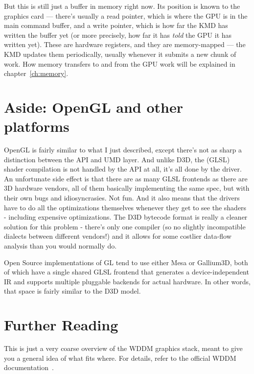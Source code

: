 But this is still just a buffer in memory right now. Its position is known to
the graphics card --- there's usually a read pointer, which is where the GPU is
in the main command buffer, and a write pointer, which is how far the KMD has
written the buffer yet (or more precisely, how far it has \emph{told} the GPU
it has written yet). These are hardware registers, and they are memory-mapped
--- the KMD updates them periodically, usually whenever it submits a new chunk
of work. How memory transfers to and from the GPU work will be explained in
chapter~\ref{ch:memory}.

\section{Aside: OpenGL and other platforms}

OpenGL is fairly similar to what I just described, except there's not as sharp
a distinction between the API and UMD layer. And unlike D3D, the (GLSL) shader
compilation is not handled by the API at all, it's all done by the driver. An
unfortunate side effect is that there are as many GLSL frontends as there are
3D hardware vendors, all of them basically implementing the same spec, but with
their own bugs and idiosyncrasies. Not fun. And it also means that the drivers
have to do all the optimizations themselves whenever they get to see the
shaders - including expensive optimizations. The D3D bytecode format is really
a cleaner solution for this problem - there's only one compiler (so no slightly
incompatible dialects between different vendors!) and it allows for some
costlier data-flow analysis than you would normally do.

Open Source implementations of GL tend to use either Mesa or Gallium3D, both of
which have a single shared GLSL frontend that generates a device-independent IR
and supports multiple pluggable backends for actual hardware. In other words,
that space is fairly similar to the D3D model.

\section{Further Reading}

This is just a very coarse overview of the WDDM graphics stack, meant to give
you a general idea of what fits where. For details, refer to the official WDDM
documentation~\citep{wddm}.

{}
